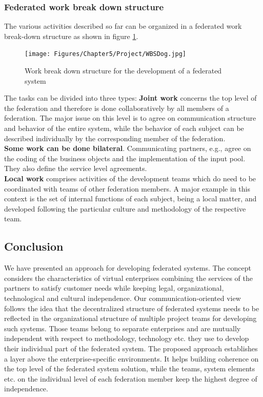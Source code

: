 \subsubsection{\textbf{Federated work break down structure}}
The various activities described so far can be organized in a federated work break-down structure as shown in figure \ref{fig:WBSDog}.

\begin{figure}[htbp]
	\centering
	\texttt{[image: Figures/Chapter5/Project/WBSDog.jpg]}
	\caption[Work break down structure for the development of a federated system]{Work break down structure for the development of a federated system}
	\label{fig:WBSDog}
\end{figure}

The tasks can be divided into three types:
\textbf{Joint work} concerns the top level of the federation and therefore is done collaboratively by all members of a federation. The major issue on this level is to agree on communication structure and behavior of the entire system, while the behavior of each subject can be described individually by the corresponding member of the federation.\\
\textbf{Some work can be done bilateral}. Communicating partners, e.g., agree on the coding of the business objects and the implementation of the input pool. They also define the service level agreements.\\
\textbf{Local work} comprises activities of the development teams which do need to be coordinated with teams of other federation members. A major example in this context is the set of internal functions of each subject, being a local matter, and developed following the particular culture and methodology of the respective team.
\\


\subsection{Conclusion}
We have presented an approach for developing federated systems. The concept considers the characteristics of virtual enterprises combining the services of the partners to satisfy customer needs while keeping legal, organizational, technological and cultural independence.
Our communication-oriented view follows the idea that the decentralized structure of federated systems needs to be reflected in the organizational structure of multiple project teams for developing such systems. Those teams belong to separate enterprises and are mutually independent with respect to methodology, technology etc. they use to develop their individual part of the federated system.
The proposed approach establishes a layer above the enterprise-specific environments. It helps building coherence on the top level of the federated system solution, while the teams, system elements etc. on the individual level of each federation member keep the highest degree of independence.

